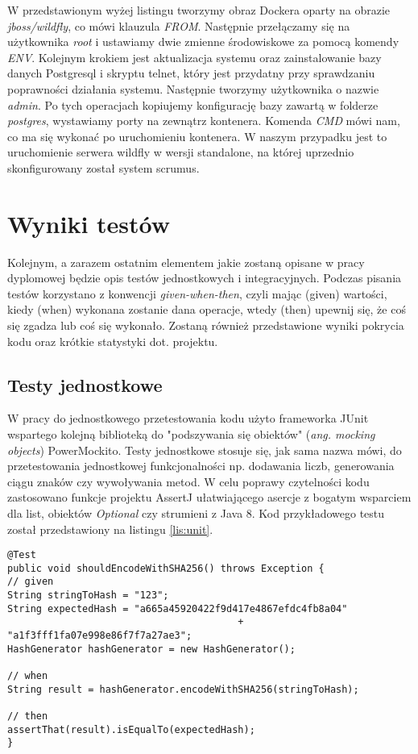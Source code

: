 W przedstawionym wyżej listingu tworzymy obraz Dockera oparty na obrazie \textit{jboss/wildfly}, co mówi klauzula \textit{FROM}. Następnie przełączamy się na użytkownika \textit{root} i ustawiamy dwie zmienne środowiskowe za pomocą komendy \textit{ENV}. Kolejnym krokiem jest aktualizacja systemu oraz zainstalowanie bazy danych Postgresql i skryptu telnet, który jest przydatny przy sprawdzaniu poprawności działania systemu. Następnie tworzymy użytkownika o nazwie \textit{admin}. Po tych operacjach kopiujemy konfigurację bazy zawartą w folderze \textit{postgres}, wystawiamy porty na zewnątrz kontenera. Komenda \textit{CMD} mówi nam, co ma się wykonać po uruchomieniu kontenera. W naszym przypadku jest to uruchomienie serwera wildfly w wersji standalone, na której uprzednio skonfigurowany został system scrumus.

\section{Wyniki testów}
Kolejnym, a zarazem ostatnim elementem jakie zostaną opisane w pracy dyplomowej będzie opis testów jednostkowych i integracyjnych. Podczas pisania testów korzystano z konwencji \textit{given-when-then}, czyli mając (given) wartości, kiedy (when) wykonana zostanie dana operacje, wtedy (then) upewnij się, że coś się zgadza lub coś się wykonało. Zostaną również przedstawione wyniki pokrycia kodu oraz krótkie statystyki dot. projektu.

\subsection{Testy jednostkowe}
W pracy do jednostkowego przetestowania kodu użyto frameworka JUnit wspartego kolejną biblioteką do "podszywania się obiektów" (\textit{ang. mocking objects}) PowerMockito. Testy jednostkowe stosuje się, jak sama nazwa mówi, do przetestowania jednostkowej funkcjonalności np. dodawania liczb, generowania ciągu znaków czy wywoływania metod. W celu poprawy czytelności kodu zastosowano funkcje projektu AssertJ ułatwiającego asercje z bogatym wsparciem dla list, obiektów \textit{Optional} czy strumieni z Java 8. Kod przykładowego testu został przedstawiony na listingu \ref{lis:unit}.

\begin{lstlisting}[caption={Kod przykładowego testu jednostkowego}, label=lis:unit, numbers=none]
@Test
public void shouldEncodeWithSHA256() throws Exception {
// given
String stringToHash = "123";
String expectedHash = "a665a45920422f9d417e4867efdc4fb8a04"
										+ "a1f3fff1fa07e998e86f7f7a27ae3";
HashGenerator hashGenerator = new HashGenerator();

// when
String result = hashGenerator.encodeWithSHA256(stringToHash);

// then
assertThat(result).isEqualTo(expectedHash);
}\end{lstlisting}

